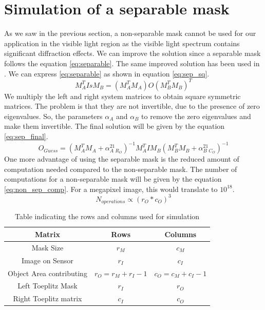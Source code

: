     
\section{Simulation of a separable mask}
As we saw in the previous section, a non-separable mask cannot be used for our application in the visible light region as the visible light spectrum contains significant diffraction effects. We can improve the solution since a separable mask follows the equation \ref{eq:separable}. The same improved solution has been used in \cite{Toeplitz}. We can express \ref{eq:separable} as shown in equation \ref{eq:sep_sq}.
\begin{equation}
M_{A}^TIsM_{B} = (M_{A}^TM_{A})O(M_{B}^TM_B)^T 
\label{eq:sep_sq}
\end{equation} 
We multiply the left and right system matrices to obtain square symmetric matrices. The problem is that they are not invertible, due to the presence of zero eigenvalues. So, the parameters $\alpha_A$ and $\alpha_B$ to remove the zero eigenvalues and make them invertible. The final solution will be given by the equation \ref{eq:sep_final}.
\begin{equation}
O_{Guess} = (M_{A}^TM_A + \alpha_{A}^21_{R_{O}})^{-1}M_{A}^TIM_{B}(M_{B}^TM_B + \alpha_{B}^21_{C_{O}})^{-1}
\label{eq:sep_final}
\end{equation}
One more advantage of using the separable mask is the reduced amount of computation needed compared to the non-separable mask. The number of computations for a non-separable mask will be given by the equation \ref{eq:non_sep_comp}. For a megapixel image, this would translate to $10^{18}$.
\begin{equation}
N_{operations} \propto (r_O*c_O)^3
\label{eq:non_sep_comp}
\end{equation}

\begin{table}[ht]
\caption{Table indicating the rows and columns used for simulation}
\label{tbl:comp_sep}
\begin{center}
\begin{tabular}{ |c|c|c| }
\hline
Matrix & Rows & Columns \\
\hline
Mask Size & $r_M$ & $c_M$\\
\hline
Image on Sensor & $r_I$ & $c_I$\\
\hline
Object Area contributing &  $r_O = r_M + r_I - 1$ & $c_O = c_M + c_I - 1$\\
\hline
Left Toeplitz Mask & $r_{I}$ & $r_{O}$\\
\hline
Right Toeplitz matrix & $c_{I}$ & $c_{O}$\\
\hline
\end{tabular}
\end{center}
\end{table}


